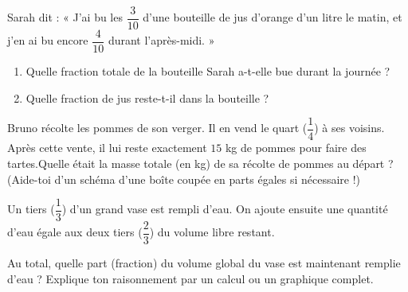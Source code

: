 \documentclass[../../syllabus_1.tex]{subfiles}
\begin{document}
\begin{itemize}
\begin{exercise}
\begin{enumerate}
\begin{center}
\end{center}

\end{enumerate}

\end{exercise}

\begin{exercise}
     Sarah dit : « J'ai bu les $\dfrac{3}{10}$ d'une bouteille de jus d'orange d'un litre le matin, et j'en ai bu encore $\dfrac{4}{10}$ durant l'après-midi. »
    \begin{enumerate}
        \item Quelle fraction totale de la bouteille Sarah a-t-elle bue durant la journée ?
        \item Quelle fraction de jus reste-t-il dans la bouteille ?
    \end{enumerate}
\end{exercise}
 
\begin{exercise}
     Bruno récolte les pommes de son verger. Il en vend le quart ($\dfrac{1}{4}$) à ses voisins. Après cette vente, il lui reste exactement $15$ kg de pommes pour faire des tartes.Quelle était la masse totale (en kg) de sa récolte de pommes au départ ? (Aide-toi d'un schéma d'une boîte coupée en parts égales si nécessaire !)
\end{exercise}
 
\begin{exercise}
    Un tiers ($\dfrac{1}{3}$) d'un grand vase est rempli d'eau. On ajoute ensuite une quantité d'eau égale aux deux tiers ($\dfrac{2}{3}$) du volume libre restant.
 
    Au total, quelle part (fraction) du volume global du vase est maintenant remplie d'eau ? Explique ton raisonnement par un calcul ou un graphique complet.
\end{exercise}

\newpage

\end{itemize}
\end{document}
